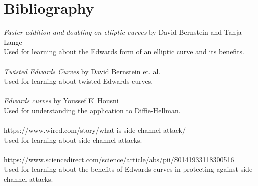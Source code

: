 \documentclass[12pt]{article}
\theoremstyle{definition}
\begin{document}
\section{Bibliography}
\textit{Faster addition and doubling on elliptic curves} by David Bernstein and Tanja Lange
\\
Used for learning about the Edwards form of an elliptic curve and its benefits.
\\\\
\textit{Twisted Edwards Curves} by David Bernstein et. al.
\\
Used for learning about twisted Edwards curves.
\\\\
\textit{Edwards curves} by Youssef El Housni
\\
Used for understanding the application to Diffie-Hellman.
\\\\
https://www.wired.com/story/what-is-side-channel-attack/
\\
Used for learning about side-channel attacks.
\\\\
https://www.sciencedirect.com/science/article/abs/pii/S0141933118300516
\\
Used for learning about the benefits of Edwards curves in protecting against side-channel attacks.
\end{document}
